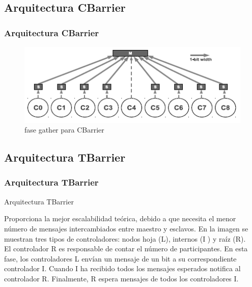 \documentclass[11pt]{beamer}					%
\begin{document}
			\subsection{Arquitectura CBarrier}			
			\begin{frame}[fragile]
		\frametitle{Arquitectura CBarrier}
			
	\begin{figure}[ht] %
	\centering
		\includegraphics[scale=1]{imagenes/CBarrier.png}   %
	\caption{fase gather para CBarrier} \label{fig:fase gather para CBarrier}
\end{figure}
				
	
			\end{frame}
			
\subsection{Arquitectura TBarrier}			
			\begin{frame}[fragile]
		\frametitle{Arquitectura TBarrier}
			
			\begin{block}{Arquitectura TBarrier}
			
			
Proporciona la mejor escalabilidad teórica, debido a
que necesita el menor número de mensajes intercambiados
entre maestro y esclavos. En la imagen se muestran 
tres tipos de controladores: nodos hoja (L), internos (I ) y raíz (R).\\
El controlador R es responsable de contar el
número de participantes. En esta fase, los controladores
L envían un mensaje de un bit a su correspondiente
controlador I. Cuando I ha recibido todos
los mensajes esperados notifica al controlador R.
Finalmente, R espera mensajes de todos los controladores
I.

				\end{block}
				
	
			\end{frame}
			
\end{document}
